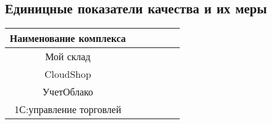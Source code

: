\documentclass[14pt]{extarticle}
\begin{document}
\subsection{Единицные показатели качества и их меры}

\begin{tabular}{|c|c|c|c|c|c|}
	\hline
	Наименование комплекса &  &  &  & & \\ \hline
	Мой склад &  &  &  & & \\ \hline
	CloudShop &  &  &  & & \\ \hline
	УчетОблако &  &  &  & & \\ \hline
	1С:управление торговлей &  &  &  & & \\ \hline
\end{tabular}
\end{document}
